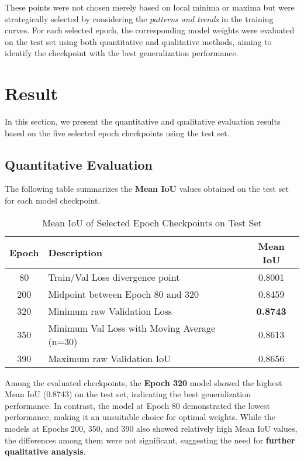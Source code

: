 \documentclass{article}
\begin{document}
These points were not chosen merely based on local minima or maxima but were strategically selected by considering the \textit{patterns and trends} in the training curves. For each selected epoch, the corresponding model weights were evaluated on the test set using both quantitative and qualitative methods, aiming to identify the checkpoint with the best generalization performance.


\section{Result}

In this section, we present the quantitative and qualitative evaluation results based on the five selected epoch checkpoints using the test set.

\subsection{Quantitative Evaluation}

The following table summarizes the \textbf{Mean IoU} values obtained on the test set for each model checkpoint.

\begin{table}[h]
\centering
\caption{Mean IoU of Selected Epoch Checkpoints on Test Set}
\label{tab:mean_iou}
\begin{tabular}{|c|l|c|}
\hline
\textbf{Epoch} & \textbf{Description} & \textbf{Mean IoU} \\
\hline
80   & Train/Val Loss divergence point                  & 0.8001 \\
200  & Midpoint between Epoch 80 and 320                & 0.8459 \\
320  & Minimum raw Validation Loss                      & \textbf{0.8743} \\
350  & Minimum Val Loss with Moving Average (n=30)      & 0.8613 \\
390  & Maximum raw Validation IoU                       & 0.8656 \\
\hline
\end{tabular}
\end{table}

Among the evaluated checkpoints, the \textbf{Epoch 320} model showed the highest Mean IoU (0.8743) on the test set, indicating the best generalization performance. In contrast, the model at Epoch 80 demonstrated the lowest performance, making it an unsuitable choice for optimal weights. While the models at Epochs 200, 350, and 390 also showed relatively high Mean IoU values, the differences among them were not significant, suggesting the need for \textbf{further qualitative analysis}.
\end{document}
